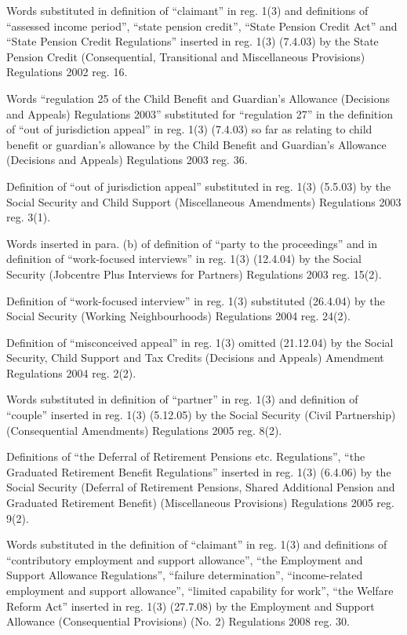 \documentclass[12pt,a4paper]{article}
\begin{document}
{Words substituted in definition of ``claimant'' in reg. 1(3) and definitions of ``assessed income period'', ``state pension credit'', ``State Pension Credit Act'' and ``State Pension Credit Regulations'' inserted in reg. 1(3) (7.4.03) by the State Pension Credit (Consequential, Transitional and Miscellaneous Provisions) Regulations 2002 reg. 16.

Words ``regulation 25 of the Child Benefit and Guardian's Allowance (Decisions and Appeals) Regulations 2003'' substituted for ``regulation 27'' in the definition of ``out of jurisdiction appeal'' in reg. 1(3) (7.4.03) so far as relating to child benefit or guardian's allowance by the Child Benefit and Guardian’s Allowance (Decisions and Appeals) Regulations 2003 reg. 36.

Definition of ``out of jurisdiction appeal'' substituted in reg. 1(3) (5.5.03) by the Social Security and Child Support (Miscellaneous Amendments) Regulations 2003 reg. 3(1).

Words inserted in para. (b) of definition of ``party to the proceedings'' and in definition of ``work-focused interviews'' in reg. 1(3) (12.4.04) by the Social Security (Jobcentre Plus Interviews for Partners) Regulations 2003 reg. 15(2).

Definition of ``work-focused interview'' in reg. 1(3) substituted (26.4.04) by the Social Security (Working Neighbourhoods) Regulations 2004 reg. 24(2).

Definition of ``misconceived appeal'' in reg. 1(3) omitted (21.12.04) by the Social Security, Child Support and Tax Credits (Decisions and Appeals) Amendment Regulations 2004 reg. 2(2).

Words substituted in definition of ``partner'' in reg. 1(3) and definition of ``couple'' inserted in reg. 1(3) (5.12.05) by the Social Security (Civil Partnership) (Consequential Amendments) Regulations 2005 reg. 8(2).

Definitions of ``the Deferral of Retirement Pensions etc. Regulations'', ``the Graduated Retirement Benefit Regulations'' inserted in reg. 1(3) (6.4.06) by the Social Security (Deferral of Retirement Pensions, Shared Additional Pension and Graduated Retirement Benefit) (Miscellaneous Provisions) Regulations 2005 reg. 9(2).

Words substituted in the definition of ``claimant'' in reg. 1(3) and definitions of ``contributory employment and support allowance'', ``the Employment and Support Allowance Regulations'', ``failure determination'', ``income-related employment and support allowance'', ``limited capability for work'', ``the Welfare Reform Act'' inserted in reg. 1(3) (27.7.08) by the Employment and Support Allowance (Consequential Provisions) (No. 2) Regulations 2008 reg. 30.

}
\end{document}
